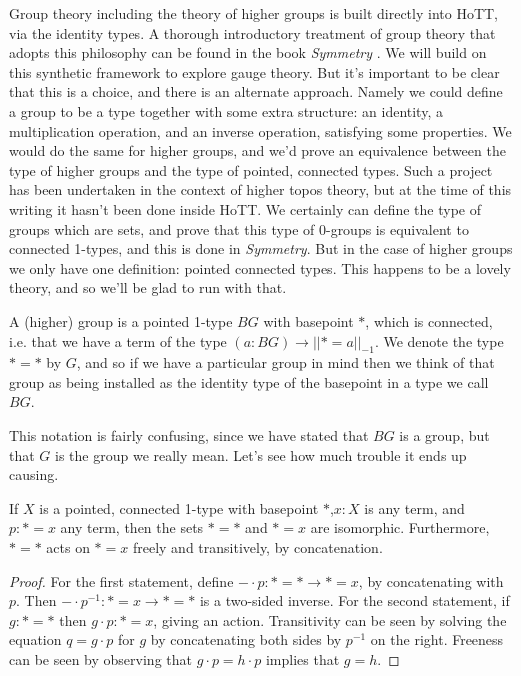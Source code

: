 \documentclass[12pt]{report}
\begin{document}
Group theory including the theory of higher groups is built directly into HoTT, via the identity types. A thorough introductory treatment of group theory that adopts this philosophy can be found in the book \emph{Symmetry} \cite{Symmetry}. We will build on this synthetic framework to explore gauge theory. But it's important to be clear that this is a choice, and there is an alternate approach. Namely we could define a group to be a type together with some extra structure: an identity, a multiplication operation, and an inverse operation, satisfying some properties. We would do the same for higher groups, and we'd prove an equivalence between the type of higher groups and the type of pointed, connected types. Such a project has been undertaken in the context of higher topos theory, but at the time of this writing it hasn't been done inside HoTT. We certainly can define the type of groups which are sets, and prove that this type of 0-groups is equivalent to connected 1-types, and this is done in \emph{Symmetry}. But in the case of higher groups we only have one definition: pointed connected types. This happens to be a lovely theory, and so we'll be glad to run with that.

\begin{mydef} A (higher) group is a pointed 1-type $BG$ with basepoint $*$, which is connected, i.e. that we have a term of the type $(a:BG)\to||*=a||_{-1}$. We denote the type $*=*$ by $G$, and so if we have a particular group in mind then we think of that group as being installed as the identity type of the basepoint in a type we call $BG$.
\end{mydef}

This notation is fairly confusing, since we have stated that $BG$ is a group, but that $G$ is the group we really mean. Let's see how much trouble it ends up causing.

\begin{mylemma}
If $X$ is a pointed, connected 1-type with basepoint $*$,$x:X$ is any term, and $p:*=x$ any term, then the sets $*=*$ and $*=x$ are isomorphic. Furthermore, $*=*$ acts on $*=x$ freely and transitively, by concatenation.
\end{mylemma}
\begin{proof}
For the first statement, define $-\cdot p:*=*\to *=x$, by concatenating with $p$. Then $-\cdot p^{-1}:*=x\to *=*$ is a two-sided inverse. For the second statement, if $g:*=*$ then $g\cdot p:*=x$, giving an action. Transitivity can be seen by solving the equation $q = g\cdot p$ for $g$ by concatenating both sides by $p^{-1}$ on the right. Freeness can be seen by observing that $g\cdot p = h\cdot p$ implies that $g=h$.
\end{proof}
\end{document}
